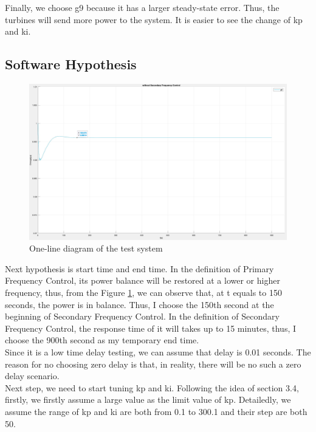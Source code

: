 \documentclass{report}
\begin{document}
Finally, we choose g9 because it has a larger steady-state error. Thus, the turbines will send more power to the system. It is easier to see the change of kp and ki.\\

\subsection{Software Hypothesis} %

\begin{figure}[htbp]
\centering
\includegraphics[width = .891\textwidth]{figure/4_1_1_without3.jpeg}
\caption{One-line diagram of the test system}
\label{4_1_1_without3}
\end{figure}
Next hypothesis is start time and end time. In the definition of Primary Frequency Control, its power balance will be restored at a lower or higher frequency, thus, from the Figure \textcolor{red}{\ref{4_1_1_without3}}, we can observe that, at t equals to 150 seconds, the power is in balance. Thus, I choose the 150th second at the beginning of Secondary Frequency Control. In the definition of Secondary Frequency Control, the response time of it will takes up to 15 minutes, thus, I choose the 900th second as my temporary end time.\\

Since it is a low time delay testing, we can assume that delay is 0.01 seconds. The reason for no choosing zero delay is that, in reality, there will be no such a zero delay scenario.\\

Next step, we need to start tuning kp and ki. Following the idea of section 3.4, firstly, we firstly assume a large value as the limit value of kp. Detailedly, we assume the range of kp and ki are both from 0.1 to 300.1 and their step are both 50. \\
\end{document}
